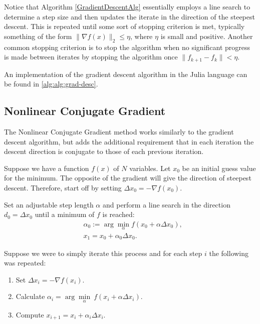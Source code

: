 Notice that Algorithm \ref{GradientDescentAlg} essentially employs a line search to determine a step size and then updates the iterate in the direction of the steepest descent. This is repeated until some sort of stopping criterion is met, typically something of the form $\|\nabla f(x)\|_2\leq\eta$, where $\eta$ is small and positive. Another common stopping criterion is to stop the algorithm when no significant progress is made between iterates by stopping the algorithm once $\|f_{k+1}-f_{k}\|<\eta$.

An implementation of the gradient descent algorithm in the Julia language can be found in \ref{alg:alg:grad-desc}.

\subsection{Nonlinear Conjugate Gradient}

The Nonlinear Conjugate Gradient method works similarly to the gradient descent algorithm, but adds the additional requirement that in each iteration the descent direction is conjugate to those of each previous iteration.

Suppose we have a function $f(x)$ of $N$ variables. Let $x_0$ be an initial guess value for the minimum. The opposite of the gradient will give the direction of steepest descent. Therefore, start off by setting $\Delta x_0=-\nabla f(x_0)$.

Set an adjustable step length $\alpha$ and perform a line search in the direction $d_0=\Delta x_0$ until a minimum of $f$ is reached:
\begin{align*}
	& \alpha_0:=\arg\min_{\alpha} f(x_0+\alpha\Delta x_0), \\
	& x_1=x_0+\alpha_0\Delta x_0.                          
\end{align*}

Suppose we were to simply iterate this process and for each step $i$ the following was repeated:

\begin{enumerate}
	\item Set $\Delta x_i=-\nabla f(x_i)$.
	\item Calculate $\alpha_i=\arg\underset{\alpha}{\min}\ f(x_i+\alpha\Delta x_i)$.
	\item Compute $x_{i+1}=x_i+\alpha_i\Delta x_i$.
\end{enumerate}

